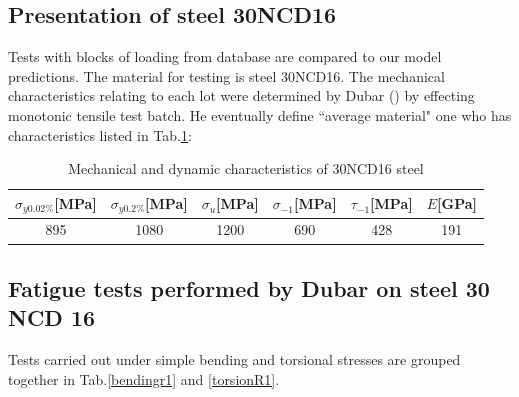 \subsection{Presentation of steel 30NCD16}
Tests with blocks of loading from database are compared to our model predictions. The material for testing is steel 30NCD16. The mechanical characteristics relating to each lot were determined by Dubar (\cite{Dubar1992}) by effecting monotonic tensile test batch. He eventually define ``average material" one who has characteristics listed in Tab.\ref{30ncdchar}:

\begin{table}[!h]
\centering
\begin{tabular}{|c|c|c|c|l|c|}
\hline
\textbf{$\sigma_{y0.02\%}${[}MPa{]}} & \textbf{$\sigma_{y0.2\%}${[}MPa{]}} & \textbf{$\sigma_u${[}MPa{]}} & \textbf{$\sigma_{-1}${[}MPa{]}} & \textbf{$\tau_{-1}${[}MPa{]}} & \textbf{$E${[}GPa{]}}\\ \hline
895                                  & 1080                                & 1200                         & 690                             & \multicolumn{1}{c|}{428}     & 191 \\ \hline
\end{tabular}
\caption{Mechanical and dynamic characteristics of 30NCD16 steel \cite{Dubar1992}}
\label{30ncdchar}
\end{table}

\subsection{Fatigue tests performed by Dubar on steel 30 NCD 16}
Tests carried out under simple bending and torsional stresses are grouped together in
Tab.\ref{bendingr1} and \ref{torsionR1}.

